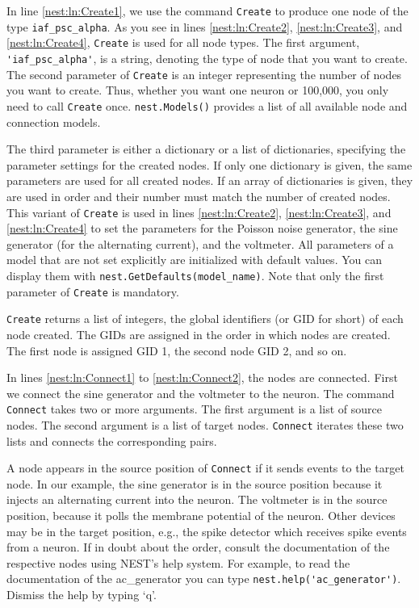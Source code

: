 \documentclass{article}
\begin{document}
In line \ref{nest:ln:Create1}, we use the command \lstinline!Create!
to produce one node of the type \lstinline!iaf_psc_alpha!. As you see in
lines \ref{nest:ln:Create2}, \ref{nest:ln:Create3}, and
\ref{nest:ln:Create4}, \lstinline!Create! is used for all node types.
The first argument, \lstinline!'iaf_psc_alpha'!, is a string, denoting
the type of node that you want to create.
The second parameter of \lstinline!Create! is an integer representing
the number of nodes you want to create. Thus, whether you want one neuron
or 100,000, you only need to call \lstinline!Create! once.
\lstinline!nest.Models()! provides a list of all available node and
connection models.

The third parameter is either a dictionary or a list of dictionaries,
specifying the parameter settings for the created nodes. If only one
dictionary is given, the same parameters are used for all created
nodes. If an array of dictionaries is given, they are used in order
and their number must match the number of created nodes. This variant
of \lstinline!Create! is used in lines \ref{nest:ln:Create2},
\ref{nest:ln:Create3}, and \ref{nest:ln:Create4} to set the parameters
for the Poisson noise generator, the sine generator (for the
alternating current), and the voltmeter. All parameters of a model
that are not set explicitly are initialized with default values. You
can display them with
{  %
\lstinline!nest.GetDefaults(model_name)!}.
Note that only the first
parameter of \lstinline!Create! is mandatory. 

\lstinline!Create! returns a list of integers, the  global
identifiers (or GID for short)
 of each node created. The GIDs are
assigned in the order in which nodes are created. The first node is
assigned GID 1, the second node GID 2, and so on.

In lines \ref{nest:ln:Connect1} to \ref{nest:ln:Connect2}, the nodes
are connected. First we connect the sine generator and the voltmeter
to the neuron. The command  \lstinline!Connect! takes two or more
arguments. The first argument is a list of source nodes. The second
argument is a list of target nodes. \lstinline!Connect! iterates these
two lists and connects the corresponding pairs.

A node appears in the source position of \lstinline!Connect! if it sends events
to the target node. In our example, the sine generator is in the
source position because it injects an alternating current into the
neuron. The voltmeter is in the source position, because it polls the
membrane potential of the neuron. Other devices may be in the target
position, e.g., the spike detector which receives spike events from a
neuron. If in doubt about the order, consult the documentation of the
respective nodes using NEST's help system. For example, to read the
documentation of the ac\_generator you can type
\lstinline!nest.help('ac_generator')!. 
Dismiss the help by typing `q'.
\end{document}
